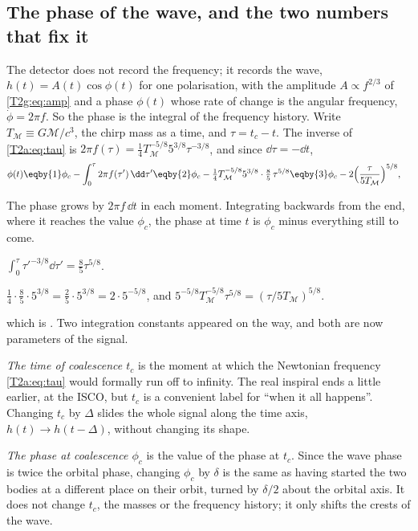 \subsection{The phase of the wave, and the two numbers that fix it}
\label{T2g:sec:tc-phic}

The detector does not record the frequency; it records the wave, $h(t)=A(t)\cos\phi(t)$ for one polarisation, with the amplitude $A\propto f^{2/3}$ of \eqref{T2g:eq:amp} and a phase $\phi(t)$ whose rate of change is the angular frequency, $\dot\phi=2\pi f$. So the phase is the integral of the frequency history. Write $T_{\mathcal M}\equiv G\mathcal M/c^3$, the chirp mass as a time, and $\tau=t_c-t$. The inverse of \eqref{T2a:eq:tau} is $2\pi f(\tau)=\tfrac14T_{\mathcal M}^{-5/8}5^{3/8}\tau^{-3/8}$, and since $\dd\tau=-\dd t$,
\begin{align}
  \phi(t)
  &\eqby{1}\phi_c-\int_0^{\tau}2\pi f(\tau')\,\dd\tau'
  \eqby{2}\phi_c-\tfrac14T_{\mathcal M}^{-5/8}5^{3/8}\cdot\tfrac85\,\tau^{5/8}
  \eqby{3}\phi_c-2\Big(\frac{\tau}{5T_{\mathcal M}}\Big)^{5/8},
  \label{T2g:eq:phit}
\end{align}
\begin{explain}
  \item The phase grows by $2\pi f\,\dd t$ in each moment. Integrating backwards from the end, where it reaches the value $\phi_c$, the phase at time $t$ is $\phi_c$ minus everything still to come.
  \item $\int_0^\tau\tau'^{-3/8}\dd\tau'=\tfrac85\tau^{5/8}$.
  \item $\tfrac14\cdot\tfrac85\cdot5^{3/8}=\tfrac25\cdot5^{3/8}=2\cdot5^{-5/8}$, and $5^{-5/8}T_{\mathcal M}^{-5/8}\tau^{5/8}=(\tau/5T_{\mathcal M})^{5/8}$.
\end{explain}
which is \cite[eq.~(17)]{CutlerFlanagan1994}. Two integration constants appeared on the way, and both are now parameters of the signal.

\emph{The time of coalescence $t_c$} is the moment at which the Newtonian frequency \eqref{T2a:eq:tau} would formally run off to infinity. The real inspiral ends a little earlier, at the ISCO, but $t_c$ is a convenient label for ``when it all happens''. Changing $t_c$ by $\Delta$ slides the whole signal along the time axis, $h(t)\to h(t-\Delta)$, without changing its shape.

\emph{The phase at coalescence $\phi_c$} is the value of the phase at $t_c$. Since the wave phase is twice the orbital phase, changing $\phi_c$ by $\delta$ is the same as having started the two bodies at a different place on their orbit, turned by $\delta/2$ about the orbital axis. It does not change $t_c$, the masses or the frequency history; it only shifts the crests of the wave.

